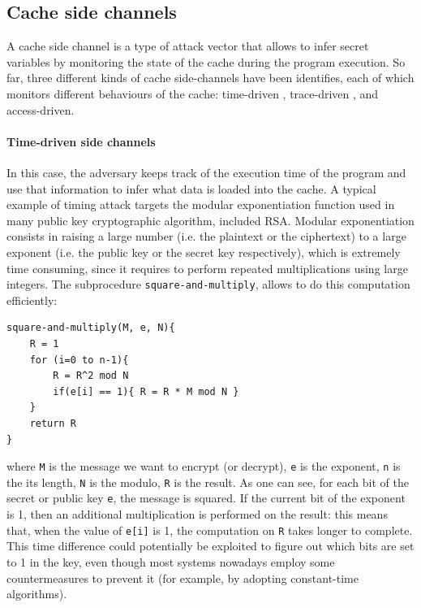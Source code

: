 \documentclass[12pt,a4paper]{book}
\theoremstyle{definition}
\begin{document}
	\subsection{Cache side channels}\label{sec:cache-sc}
	A cache side channel \cite{Zhang2017} is a type of attack vector that allows to infer secret variables by monitoring the state of the cache during the program execution. So far, three different kinds of cache side-channels have been identifies, each of which monitors different behaviours of the cache: time-driven \cite{Page2002}, trace-driven \cite{Page2002}, and access-driven.
	\paragraph{Time-driven side channels} In this case, the adversary keeps track of the execution time of the program and use that information to infer what data is loaded into the cache. 
	A typical example of timing attack targets the modular exponentiation function used in many public key cryptographic algorithm, included RSA. Modular exponentiation consists in raising a large number (i.e. the plaintext or the ciphertext) to a large exponent (i.e. the public key or the secret key respectively), which is extremely time consuming, since it requires to perform repeated multiplications using large integers. The subprocedure \texttt{square-and-multiply}, allows to do this computation efficiently:
	
	\vspace{3mm}
	\begin{minipage}{.6\textwidth}
	\begin{lstlisting}
square-and-multiply(M, e, N){
	R = 1
	for (i=0 to n-1){
		R = R^2 mod N
		if(e[i] == 1){ R = R * M mod N }
	}	
	return R
}
	\end{lstlisting}
	\end{minipage}

	where \texttt{M} is the message we want to encrypt (or decrypt), \texttt{e} is the exponent, \texttt{n} is the its length, \texttt{N} is the modulo, \texttt{R} is the result. As one can see, for each bit of the secret or public key \texttt{e}, the message is squared. If the current bit of the exponent is 1, then an additional multiplication is performed on the result: this means that, when the value of \texttt{e[i]} is 1, the computation on \texttt{R} takes longer to complete. This time difference could potentially be exploited to figure out which bits are set to 1 in the key, even though most systems nowadays employ some countermeasures to prevent it (for example, by adopting constant-time algorithms).
\end{document}
